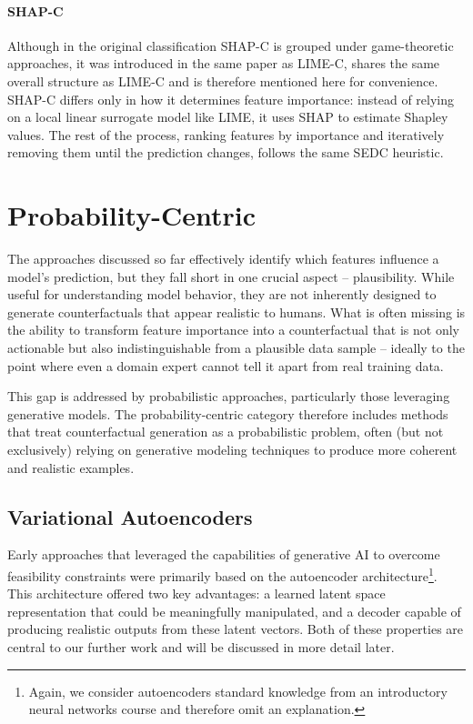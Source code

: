 \begin{methodparagraph}
    \paragraph{SHAP-C} Although in the original classification SHAP-C is grouped under game-theoretic approaches,
    it was introduced in the same paper as LIME-C, shares the same overall structure as LIME-C and is therefore mentioned here for convenience.
    SHAP-C differs only in how it determines feature importance: instead of relying on a local linear surrogate model like LIME,
    it uses SHAP \cite{lundberg2017unified} to estimate Shapley values.
    The rest of the process, ranking features by importance and iteratively removing them until the prediction changes,
    follows the same SEDC heuristic.
\end{methodparagraph}

\section{Probability-Centric}

The approaches discussed so far effectively identify which features influence a model's prediction,
but they fall short in one crucial aspect -- plausibility. While useful for understanding model behavior,
they are not inherently designed to generate counterfactuals that appear realistic to humans. What is often missing is the ability to transform feature importance into a counterfactual that is not only actionable
but also indistinguishable from a plausible data sample -- ideally to the point where even a domain expert cannot tell it apart from real training data.

This gap is addressed by probabilistic approaches, particularly those leveraging generative models.
The probability-centric category therefore includes methods that treat counterfactual generation as a probabilistic problem,
often (but not exclusively) relying on generative modeling techniques to produce more coherent and realistic examples.

\subsection{Variational Autoencoders}

Early approaches that leveraged the capabilities of generative AI to overcome feasibility constraints
were primarily based on the autoencoder architecture\footnote{Again, we consider autoencoders standard knowledge
    from an introductory neural networks course and therefore omit an explanation.}.
This architecture offered two key advantages: a learned latent space representation that could be meaningfully manipulated,
and a decoder capable of producing realistic outputs from these latent vectors.
Both of these properties are central to our further work and will be discussed in more detail later.

